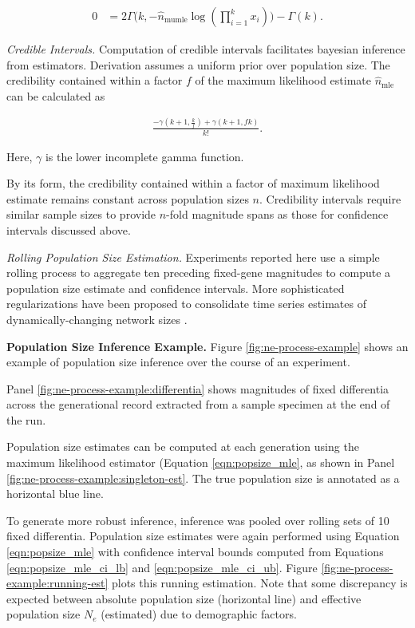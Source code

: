 \begin{footnotesize}
\begin{align*}
0
&= 2\Gamma\Big(k, -\hat{n}_\mathrm{mumle}\log(\prod_{i=1}^k x_i)\Big) - \Gamma(k).
\end{align*}
\end{footnotesize}

\textit{Credible Intervals.}
Computation of credible intervals facilitates bayesian inference from estimators.
Derivation assumes a uniform prior over population size.
The credibility contained within a factor $f$ of the maximum likelihood estimate $\hat{n}_\mathrm{mle}$ can be calculated as

\begin{footnotesize}
\begin{align*}
\frac{- \gamma(k + 1, \frac{k}{f}) + \gamma(k + 1, f k)}{k!}.
\end{align*}
\end{footnotesize}

Here, $\gamma$ is the lower incomplete gamma function.

By its form, the credibility contained within a factor of maximum likelihood estimate remains constant across population sizes $n$.
Credibility intervals require similar sample sizes to provide $n$-fold magnitude spans as those for confidence intervals discussed above.

\textit{Rolling Population Size Estimation.}
Experiments reported here use a simple rolling process to aggregate ten preceding fixed-gene magnitudes to compute a population size estimate and confidence intervals.
More sophisticated regularizations have been proposed to consolidate time series estimates of dynamically-changing network sizes \citep{hakan2012distributed}.


\textbf{Population Size Inference Example.}
Figure \ref{fig:ne-process-example} shows an example of population size inference over the course of an experiment.

Panel \ref{fig:ne-process-example:differentia} shows magnitudes of fixed differentia across the generational record extracted from a sample specimen at the end of the run.

Population size estimates can be computed at each generation using the maximum likelihood estimator (Equation \ref{eqn:popsize_mle}, as shown in Panel \ref{fig:ne-process-example:singleton-est}.
The true population size is annotated as a horizontal blue line.

To generate more robust inference, inference was pooled over rolling sets of 10 fixed differentia.
Population size estimates were again performed using Equation \ref{eqn:popsize_mle} with confidence interval bounds computed from Equations \ref{eqn:popsize_mle_ci_lb} and \ref{eqn:popsize_mle_ci_ub}.
Figure \ref{fig:ne-process-example:running-est} plots this running estimation.
Note that some discrepancy is expected between absolute population size (horizontal line) and effective population size $N_e$ (estimated) due to demographic factors.

